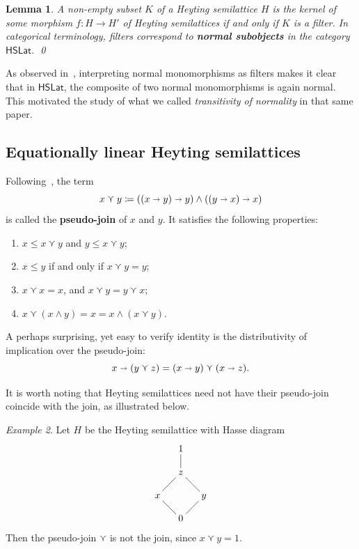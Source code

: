 \documentclass[reqno,a4paper]{amsart}
\newtheorem{lemma}{Lemma}[section]
\theoremstyle{remark}
\newtheorem{example}[lemma]{Example}
\theoremstyle{definition}
\newcommand{\defn}{\textbf}
\newcommand{\psj}{\curlyvee}
\newcommand{\noproof}{\hfill \qed}
\newcommand{\iimplies}{\shortrightarrow}
\newcommand{\HSLat}{\ensuremath{\mathsf{HSLat}}}
\renewcommand{\leq}{\leqslant}
\begin{document}
\begin{lemma}\label{Lemma Normal is Filter}
	A non-empty subset \(K\) of a Heyting semilattice \(H\) is the kernel of some morphism \(f \colon H \to H'\) of Heyting semilattices if and only if \(K\) is a filter. In categorical terminology, filters correspond to \defn{normal subobjects} in the category \(\HSLat\). \noproof
\end{lemma}

As observed in~\cite{HSLat}, interpreting normal monomorphisms as filters makes it clear that in \(\HSLat\), the composite of two normal monomorphisms is again normal. This motivated the study of what we called \emph{transitivity of normality} in that same paper.



\subsection*{Equationally linear Heyting semilattices}

Following~\cite{MR0245486}, the term
\[
	x \psj y \coloneq ((x \iimplies y) \iimplies y) \wedge ((y \iimplies x) \iimplies x)
\]
is called the \defn{pseudo-join} of \(x\) and \(y\). It satisfies the following properties:
\begin{enumerate}
	\item \(x \leq x \psj y\) and \(y \leq x \psj y\);
	\item \(x \leq y\) if and only if \(x \psj y = y\);
	\item \(x \psj x = x\), and \(x \psj y = y \psj x\);
	\item \(x \psj (x \wedge y) = x = x \wedge (x \psj y)\).
\end{enumerate}
A perhaps surprising, yet easy to verify identity is the distributivity of implication over the pseudo-join:
\[
	x \iimplies (y \psj z) = (x \iimplies y) \psj (x \iimplies z).
\]


It is worth noting that Heyting semilattices need not have their pseudo-join coincide with the join, as illustrated below.

\begin{example}\label{example non semi-boolean}
	Let \(H\) be the Heyting semilattice with Hasse diagram
	\[
		\xymatrix@!=0ex{
		& 1 &\\
		& z\ar@{-}[u] &\\
		x\ar@{-}[ur] & & y \ar@{-}[ul]\\
		& 0\ar@{-}[ul]\ar@{-}[ur] &
		}
	\]
	Then the pseudo-join \(\psj\) is not the join, since \(x \psj y = 1\).
\end{example}
\end{document}
